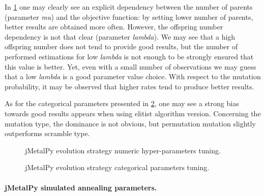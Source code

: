 In \cref{eval:pict:jmetalpy es numeric} one may clearly see an explicit dependency between the number of parents (parameter \emph{mu}) and the objective function: by setting lower number of parents, better results are obtained more often. However, the offspring number dependency is not that clear (parameter \emph{lambda}). We may see that a high offspring number does not tend to provide good results, but the number of performed estimations for low \emph{lambda} is not enough to be strongly ensured that this value is better. Yet, even with a small number of observations we may guess that a low \emph{lambda} is a good parameter value choice. With respect to the mutation probability, it may be observed that higher rates tend to produce better results. 

As for the categorical parameters presented in \cref{eval:pict:jmetalpy es categoric}, one may see a strong bias towards good results appears when using elitist algorithm version. Concerning the mutation type, the dominance is not obvious, but permutation mutation slightly outperforms scramble type.
\begin{figure}[h!]
	\centering
	\vspace{-5pt}
	
	\caption{jMetalPy evolution strategy numeric hyper-parameters tuning.}
	\label{eval:pict:jmetalpy es numeric}
	\vspace{-15pt}
\end{figure}

\begin{figure}[h!]
	\centering
	\vspace{-20pt}
	
	\caption{jMetalPy evolution strategy categorical parameters tuning.}
	\label{eval:pict:jmetalpy es categoric}
	\vspace{-20pt}
\end{figure}


\paragraph{jMetalPy simulated annealing parameters.}

